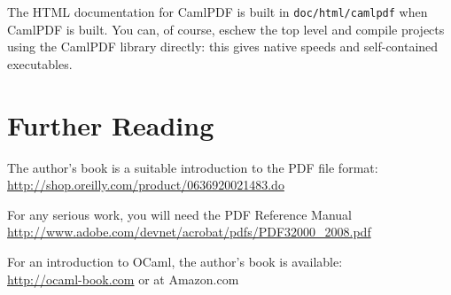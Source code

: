 \documentclass[a4paper]{memoir}
\newcommand{\smallgap}{\vspace{4mm}}
\begin{document}
\clearpage

\noindent The HTML documentation for CamlPDF is built in \texttt{doc/html/camlpdf} when \textsf{CamlPDF} is built. You can, of course, eschew the top level and compile projects using the CamlPDF library directly: this gives native speeds and self-contained executables.

\smallgap

\section*{Further Reading}
The author's book is a suitable introduction to the PDF file format:\\
\url{http://shop.oreilly.com/product/0636920021483.do}

\smallgap

\noindent For any serious work, you will need the PDF Reference Manual\\
\url{http://www.adobe.com/devnet/acrobat/pdfs/PDF32000_2008.pdf}

\smallgap

\noindent For an introduction to OCaml, the author's book is available:\\
\url{http://ocaml-book.com} or at Amazon.com

\backmatter
\printindex
\end{document}

